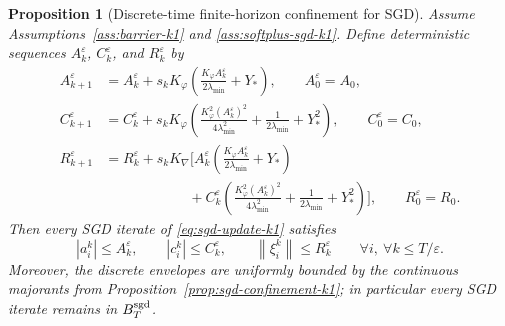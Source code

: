 \documentclass[11pt]{article}
\newtheorem{proposition}[theorem]{Proposition}
\theoremstyle{definition}
\newcommand{\norm}[1]{\left\lVert #1 \right\rVert}
\begin{document}
\begin{proposition}[Discrete-time finite-horizon confinement for SGD]
\label{prop:sgd-discrete-confinement-k1}
Assume Assumptions~\ref{ass:barrier-k1} and \ref{ass:softplus-sgd-k1}. Define
deterministic sequences $A_k^\varepsilon$, $C_k^\varepsilon$, and
$R_k^\varepsilon$ by
\begin{align}
  A_{k+1}^\varepsilon
  &=
  A_k^\varepsilon
  +
  s_k K_\varphi
  \left(
    \frac{K_\varphi A_k^\varepsilon}{2\lambda_{\min}}+Y_\ast
  \right),
  \qquad
  A_0^\varepsilon=A_0,
  \label{eq:discrete-A-envelope-k1}
  \\
  C_{k+1}^\varepsilon
  &=
  C_k^\varepsilon
  +
  s_k K_\varphi
  \left(
    \frac{K_\varphi^2 (A_k^\varepsilon)^2}{4\lambda_{\min}^2}
    +
    \frac{1}{2\lambda_{\min}}
    +
    Y_\ast^2
  \right),
  \qquad
  C_0^\varepsilon=C_0,
  \label{eq:discrete-C-envelope-k1}
  \\
  R_{k+1}^\varepsilon
  &=
  R_k^\varepsilon
  +
  s_k K_{\nabla}
  \Biggl[
    A_k^\varepsilon
    \left(
      \frac{K_\varphi A_k^\varepsilon}{2\lambda_{\min}}+Y_\ast
    \right)
    \nonumber\\
  &\qquad\qquad\qquad
    +
    C_k^\varepsilon
    \left(
      \frac{K_\varphi^2 (A_k^\varepsilon)^2}{4\lambda_{\min}^2}
      +
      \frac{1}{2\lambda_{\min}}
      +
      Y_\ast^2
    \right)
  \Biggr],
  \qquad
  R_0^\varepsilon=R_0.
  \label{eq:discrete-R-envelope-k1}
\end{align}
Then every SGD iterate of \eqref{eq:sgd-update-k1} satisfies
\[
  |a_i^k|\le A_k^\varepsilon,
  \qquad
  |c_i^k|\le C_k^\varepsilon,
  \qquad
  \norm{\xi_i^k}\le R_k^\varepsilon
  \qquad
  \forall i,\ \forall k\le T/\varepsilon.
\]
Moreover, the discrete envelopes are uniformly bounded by the continuous
majorants from Proposition~\ref{prop:sgd-confinement-k1}; in particular every
SGD iterate remains in $B_T^{\rm sgd}$.
\end{proposition}
\end{document}
